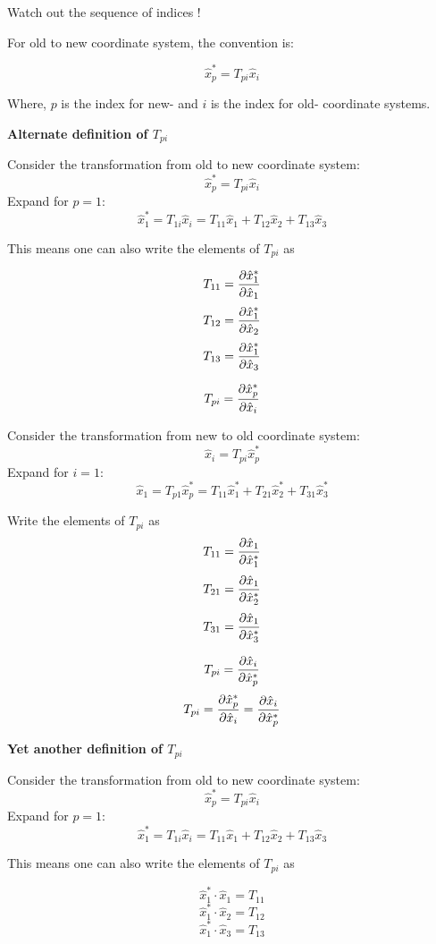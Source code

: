 Watch out the sequence of indices !	

For old to new coordinate system, the convention is:

$$ \hat{x}^*_p = T_{pi} \hat{x}_i $$

Where, $p$ is the index for new- and $i$ is the index for old- coordinate systems.

{\bf Alternate definition of $T_{pi}$}

Consider the transformation from old to new coordinate system:
$$ \hat{x}^*_p = T_{pi} \hat{x}_i $$
Expand for $p=1$:
$$ \hat{x}^*_1 = T_{1i} \hat{x}_i = T_{11} \hat{x}_1 + T_{12} \hat{x}_2 + T_{13} \hat{x}_3 $$


This means one can also write the elements of $T_{pi}$ as

$$ T_{11} ={\partial \hat{x}^*_1 \over \partial \hat{x}_1 } $$
$$ T_{12} ={\partial \hat{x}^*_1 \over \partial \hat{x}_2 } $$
$$ T_{13} ={\partial \hat{x}^*_1 \over \partial \hat{x}_3 } $$

$$ T_{pi} = {\partial \hat{x}^*_p \over \partial \hat{x}_i} $$



Consider the transformation from new to old coordinate system:
$$ \hat{x}_i = T_{pi} \hat{x}^*_p $$
Expand for $i=1$:
$$ \hat{x}_1 = T_{p1} \hat{x}^*_p = T_{11} \hat{x}^*_1 + T_{21} \hat{x}^*_2 + T_{31} \hat{x}^*_3 $$

Write the elements of $T_{pi}$ as
$$ T_{11} ={\partial \hat{x}_1 \over \partial \hat{x}^*_1 } $$
$$ T_{21} ={\partial \hat{x}_1 \over \partial \hat{x}^*_2 } $$
$$ T_{31} ={\partial \hat{x}_1 \over \partial \hat{x}^*_3 } $$

$$ T_{pi} = {\partial \hat{x}_i \over \partial \hat{x}^*_p} $$
$$ T_{pi} = {\partial \hat{x}^*_p \over \partial \hat{x}_i} = {\partial \hat{x}_i \over \partial \hat{x}^*_p}$$

{\bf Yet another definition of $T_{pi}$}

Consider the transformation from old to new coordinate system:
$$ \hat{x}^*_p = T_{pi} \hat{x}_i $$
Expand for $p=1$:
$$ \hat{x}^*_1 = T_{1i} \hat{x}_i = T_{11} \hat{x}_1 + T_{12} \hat{x}_2 + T_{13} \hat{x}_3 $$


This means one can also write the elements of $T_{pi}$ as

$$ \hat{x}^*_1 \cdot  \hat{x}_1 = T_{11} $$
$$ \hat{x}^*_1 \cdot \hat{x}_2 = T_{12} $$
$$ \hat{x}^*_1  \cdot \hat{x}_3 = T_{13} $$


